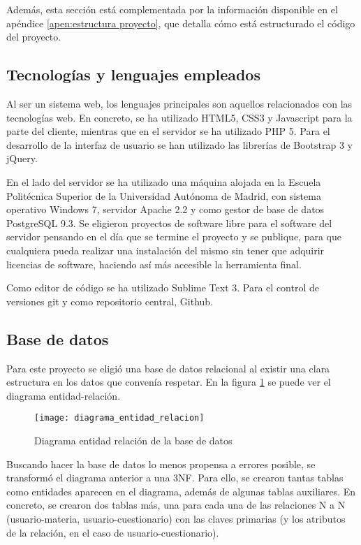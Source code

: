 Además, esta sección está complementada por la información disponible en el apéndice \ref{apen:estructura proyecto}, que detalla cómo está estructurado el código del proyecto.

\subsection{Tecnologías y lenguajes empleados\label{sec:tecnologias}}

Al ser un sistema web, los lenguajes principales son aquellos relacionados con las tecnologías web. En concreto, se ha utilizado HTML5, CSS3 y Javascript para la parte del cliente, mientras que en el servidor se ha utilizado PHP 5. Para el desarrollo de la interfaz de usuario se han utilizado las librerías de Bootstrap 3 y jQuery.

En el lado del servidor se ha utilizado una máquina alojada en la Escuela Politécnica Superior de la Universidad Autónoma de Madrid, con sistema operativo Windows 7, servidor Apache 2.2 y como gestor de base de datos PostgreSQL 9.3. Se eligieron proyectos de software libre para el software del servidor pensando en el día que se termine el proyecto y se publique, para que cualquiera pueda realizar una instalación del mismo sin tener que adquirir licencias de software, haciendo así más accesible la herramienta final.

Como editor de código se ha utilizado Sublime Text 3. Para el control de versiones git y como repositorio central, Github.


\subsection{Base de datos}

Para este proyecto se eligió una base de datos relacional al existir una clara estructura en los datos que convenía respetar. En la figura \ref{fig:base de datos} se puede ver el diagrama entidad-relación.

\begin{figure}[htp!]
	\centering
	\texttt{[image: diagrama\_entidad\_relacion]}
	\caption{Diagrama entidad relación de la base de datos}
	\label{fig:base de datos}
\end{figure}

Buscando hacer la base de datos lo menos propensa a errores posible, se transformó el diagrama anterior a una 3NF. Para ello, se crearon tantas tablas como entidades aparecen en el diagrama, además de algunas tablas auxiliares. En concreto, se crearon dos tablas más, una para cada una de las relaciones N a N (usuario-materia, usuario-cuestionario) con las claves primarias (y los atributos de la relación, en el caso de usuario-cuestionario). 


